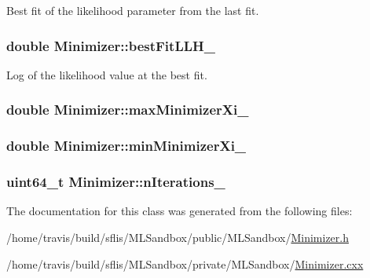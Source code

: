 Best fit of the likelihood parameter from the last fit. 

\hypertarget{classMinimizer_ace3797e38fc23cf74bf05a3b1c3cdc36}{
\subsubsection[{best\-Fit\-L\-L\-H\-\_\-}]{\setlength{\rightskip}{0pt plus 5cm}double Minimizer\-::best\-Fit\-L\-L\-H\-\_\-}}\label{classMinimizer_ace3797e38fc23cf74bf05a3b1c3cdc36}


Log of the likelihood value at the best fit. 

\hypertarget{classMinimizer_adfbb5e367fbe3893a3bb97cfead25183}{
\subsubsection[{max\-Minimizer\-Xi\-\_\-}]{\setlength{\rightskip}{0pt plus 5cm}double Minimizer\-::max\-Minimizer\-Xi\-\_\-}}\label{classMinimizer_adfbb5e367fbe3893a3bb97cfead25183}
\hypertarget{classMinimizer_a8628b992d7975decfd81d4f606072352}{
\subsubsection[{min\-Minimizer\-Xi\-\_\-}]{\setlength{\rightskip}{0pt plus 5cm}double Minimizer\-::min\-Minimizer\-Xi\-\_\-}}\label{classMinimizer_a8628b992d7975decfd81d4f606072352}
\hypertarget{classMinimizer_ac2b79419b1d5230732bdf9c3f4ead23e}{
\subsubsection[{n\-Iterations\-\_\-}]{\setlength{\rightskip}{0pt plus 5cm}uint64\-\_\-t Minimizer\-::n\-Iterations\-\_\-}}\label{classMinimizer_ac2b79419b1d5230732bdf9c3f4ead23e}


The documentation for this class was generated from the following files\-:\begin{DoxyCompactItemize}
\item 
/home/travis/build/sflis/\-M\-L\-Sandbox/public/\-M\-L\-Sandbox/\hyperlink{Minimizer_8h}{Minimizer.\-h}\item 
/home/travis/build/sflis/\-M\-L\-Sandbox/private/\-M\-L\-Sandbox/\hyperlink{MLSandbox_2Minimizer_8cxx}{Minimizer.\-cxx}\end{DoxyCompactItemize}
